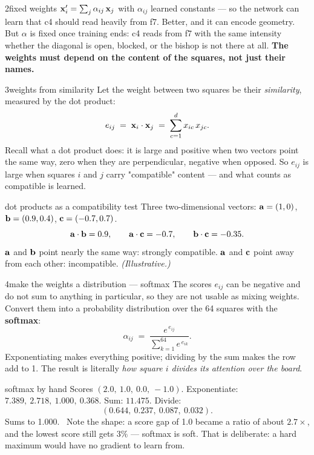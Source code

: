 \begin{attempt}{2}{fixed weights}
$\mathbf{x}_i' = \sum_j \alpha_{ij}\,\mathbf{x}_j$ with $\alpha_{ij}$ learned constants --- so the
network can learn that c4 should read heavily from f7. Better, and it can encode geometry.
But $\alpha$ is fixed once training ends: c4 reads from f7 with the same intensity whether the
diagonal is open, blocked, or the bishop is not there at all. \textbf{The weights must depend
on the content of the squares, not just their names.}
\end{attempt}

\begin{attempt}{3}{weights from similarity}
Let the weight between two squares be their \emph{similarity}, measured by the dot product:
\[
  e_{ij} \;=\; \mathbf{x}_i \cdot \mathbf{x}_j \;=\; \sum_{c=1}^{d} x_{ic}\,x_{jc}.
\]
Recall what a dot product does: it is large and positive when two vectors point the same way,
zero when they are perpendicular, negative when opposed. So $e_{ij}$ is large when squares $i$
and $j$ carry "compatible" content --- and what counts as compatible is learned.

\begin{worked}{dot products as a compatibility test}
Three two-dimensional vectors: $\mathbf{a} = (1, 0)$, $\mathbf{b} = (0.9, 0.4)$,
$\mathbf{c} = (-0.7, 0.7)$.
\[
\mathbf{a}\cdot\mathbf{b} = 0.9,\qquad \mathbf{a}\cdot\mathbf{c} = -0.7,\qquad \mathbf{b}\cdot\mathbf{c} = -0.35 .
\]
$\mathbf{a}$ and $\mathbf{b}$ point nearly the same way: strongly compatible. $\mathbf{a}$ and $\mathbf{c}$
point away from each other: incompatible. \emph{(Illustrative.)}
\end{worked}
\end{attempt}

\begin{attempt}{4}{make the weights a distribution --- softmax}
The scores $e_{ij}$ can be negative and do not sum to anything in particular, so they are not
usable as mixing weights. Convert them into a probability distribution over the 64 squares
with the \textbf{softmax}:
\begin{equation}
  \label{eq:softmax}
  \alpha_{ij} \;=\; \frac{e^{\,e_{ij}}}{\sum_{k=1}^{64} e^{\,e_{ik}}} .
\end{equation}
Exponentiating makes everything positive; dividing by the sum makes the row add to 1. The
result is literally \emph{how square $i$ divides its attention over the board}.

\begin{worked}{softmax by hand}
Scores $(2.0,\ 1.0,\ 0.0,\ -1.0)$. Exponentiate: $7.389,\ 2.718,\ 1.000,\ 0.368$. Sum:
$11.475$. Divide:
\[
  (0.644,\ 0.237,\ 0.087,\ 0.032) .
\]
Sums to 1.000. \checkmark\ Note the shape: a score gap of 1.0 became a ratio of about
$2.7\times$, and the lowest score still gets $3\%$ --- softmax is soft. That is deliberate:
a hard maximum would have no gradient to learn from.
\end{worked}
\end{attempt}

